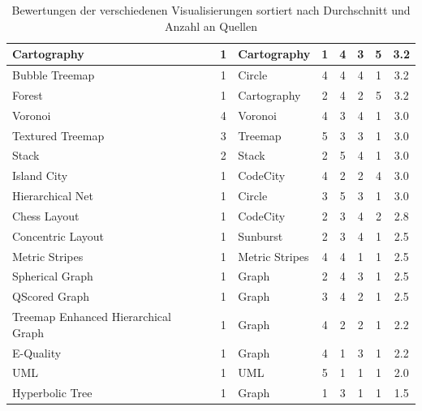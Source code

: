 \begin{table}[htbp]
{\begin{tabularx}{1.4\textwidth}{|X|X|c|X|c|c|c|c|c|}
        Cartography & \cite{softwareCartography} & 1 & Cartography & 1 & 4 & 3 & 5 & 3.2 \\ \hline
        Bubble Treemap & \cite{visualizingProgramQuality} & 1 & Circle & 4 & 4 & 4 & 1 & 3.2 \\ \hline
        Forest & \cite{softwareForest} & 1 & Cartography & 2 & 4 & 2 & 5 & 3.2 \\ \hline
        Voronoi & \cite{voronoiTree, staticSurvey, stablePredictableVoronoi, visualizationEvolution} & 4 & Voronoi & 4 & 3 & 4 & 1 & 3.0 \\ \hline
        Textured Treemap & \cite{visRealism, jarchitect_2024, ndepend} & 3 & Treemap & 5 & 3 & 3 & 1 & 3.0 \\ \hline
        Stack & \cite{visualizationEvolution, codeIsBeautiful} & 2 & Stack & 2 & 5 & 4 & 1 & 3.0 \\ \hline
        Island City & \cite{staticSurvey} & 1 & CodeCity & 4 & 2 & 2 & 4 & 3.0 \\ \hline
        Hierarchical Net & \cite{staticSurvey} & 1 & Circle & 3 & 5 & 3 & 1 & 3.0 \\ \hline
        Chess Layout & \cite{visbasedlarge} & 1 & CodeCity & 2 & 3 & 4 & 2 & 2.8 \\ \hline
        Concentric Layout & \cite{visbasedlarge} & 1 & Sunburst & 2 & 3 & 4 & 1 & 2.5 \\ \hline
        Metric Stripes & \cite{visSoftwareMetricsBook} & 1 & Metric Stripes & 4 & 4 & 1 & 1 & 2.5 \\ \hline
        Spherical Graph & \cite{metricsBased3DVisualization} & 1 & Graph & 2 & 4 & 3 & 1 & 2.5 \\ \hline
        QScored Graph & \cite{QScored} & 1 & Graph & 3 & 4 & 2 & 1 & 2.5 \\ \hline
        Treemap Enhanced Hierarchical Graph & \cite{exploringRelations} & 1 & Graph & 4 & 2 & 2 & 1 & 2.2 \\ \hline
        E-Quality & \cite{eQuality} & 1 & Graph & 4 & 1 & 3 & 1 & 2.2 \\ \hline
        UML & \cite{and_2025} & 1 & UML & 5 & 1 & 1 & 1 & 2.0 \\ \hline
        Hyperbolic Tree & \cite{visualizationEvolution} & 1 & Graph & 1 & 3 & 1 & 1 & 1.5 \\ \hline
    \end{tabularx}
    }
    \caption[Bewertungen der Visualisierungen]{Bewertungen der verschiedenen Visualisierungen sortiert nach Durchschnitt und Anzahl an Quellen}
    \label{tab:visEval_full}
\end{table}

